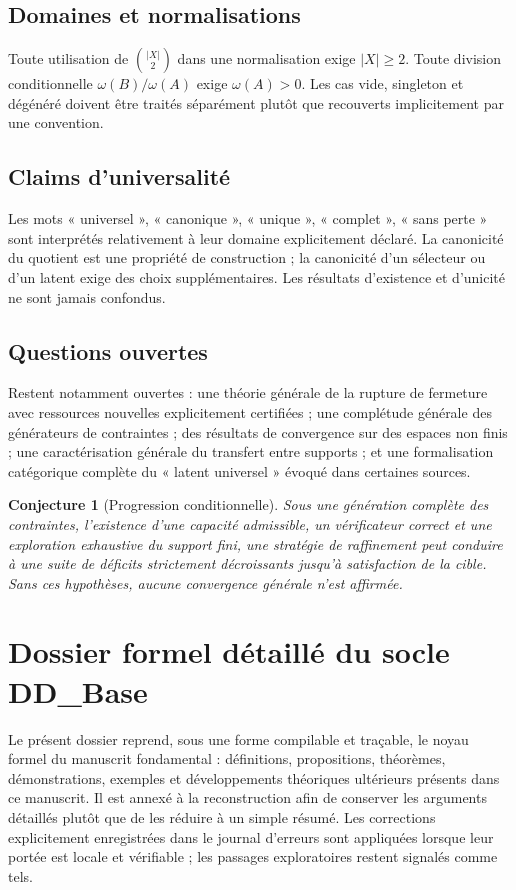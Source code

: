 \documentclass[11pt,a4paper,openany]{book}
\newtheorem{conjecture}[definition]{Conjecture}
\begin{document}
\section{Domaines et normalisations}
Toute utilisation de $\binom{|X|}{2}$ dans une normalisation exige $|X|\ge2$. Toute division conditionnelle $\omega(B)/\omega(A)$ exige $\omega(A)>0$. Les cas vide, singleton et dégénéré doivent être traités séparément plutôt que recouverts implicitement par une convention.

\section{Claims d'universalité}
Les mots « universel », « canonique », « unique », « complet », « sans perte » sont interprétés relativement à leur domaine explicitement déclaré. La canonicité du quotient est une propriété de construction ; la canonicité d'un sélecteur ou d'un latent exige des choix supplémentaires. Les résultats d'existence et d'unicité ne sont jamais confondus.

\section{Questions ouvertes}
Restent notamment ouvertes : une théorie générale de la rupture de fermeture avec ressources nouvelles explicitement certifiées ; une complétude générale des générateurs de contraintes ; des résultats de convergence sur des espaces non finis ; une caractérisation générale du transfert entre supports ; et une formalisation catégorique complète du « latent universel » évoqué dans certaines sources.

\begin{conjecture}[Progression conditionnelle]
Sous une génération complète des contraintes, l'existence d'une capacité admissible, un vérificateur correct et une exploration exhaustive du support fini, une stratégie de raffinement peut conduire à une suite de déficits strictement décroissants jusqu'à satisfaction de la cible. Sans ces hypothèses, aucune convergence générale n'est affirmée.
\end{conjecture}


\appendix

\chapter{Dossier formel détaillé du socle DD\_Base}
Le présent dossier reprend, sous une forme compilable et traçable, le noyau formel du manuscrit fondamental  : définitions, propositions, théorèmes, démonstrations, exemples et développements théoriques ultérieurs présents dans ce manuscrit. Il est annexé à la reconstruction afin de conserver les arguments détaillés plutôt que de les réduire à un simple résumé. Les corrections explicitement enregistrées dans le journal d'erreurs sont appliquées lorsque leur portée est locale et vérifiable ; les passages exploratoires restent signalés comme tels.
\end{document}
